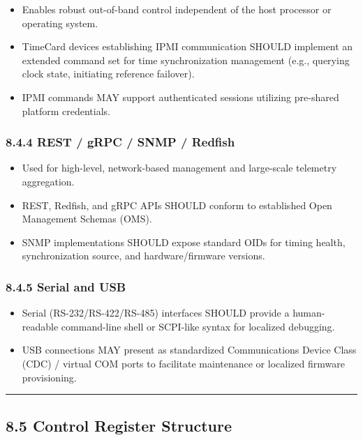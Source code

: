 \begin{itemize}
\tightlist
\item
  Enables robust out-of-band control independent of the host processor
  or operating system.
\item
  TimeCard devices establishing IPMI communication SHOULD implement an
  extended command set for time synchronization management (e.g.,
  querying clock state, initiating reference failover).
\item
  IPMI commands MAY support authenticated sessions utilizing pre-shared
  platform credentials.
\end{itemize}

\subsubsection{8.4.4 REST / gRPC / SNMP /
Redfish}\label{rest-grpc-snmp-redfish}

\begin{itemize}
\tightlist
\item
  Used for high-level, network-based management and large-scale
  telemetry aggregation.
\item
  REST, Redfish, and gRPC APIs SHOULD conform to established Open
  Management Schemas (OMS).
\item
  SNMP implementations SHOULD expose standard OIDs for timing health,
  synchronization source, and hardware/firmware versions.
\end{itemize}

\subsubsection{8.4.5 Serial and USB}\label{serial-and-usb}

\begin{itemize}
\tightlist
\item
  Serial (RS-232/RS-422/RS-485) interfaces SHOULD provide a
  human-readable command-line shell or SCPI-like syntax for localized
  debugging.
\item
  USB connections MAY present as standardized Communications Device
  Class (CDC) / virtual COM ports to facilitate maintenance or localized
  firmware provisioning.
\end{itemize}

\begin{center}\rule{0.5\linewidth}{0.5pt}\end{center}

\subsection{8.5 Control Register
Structure}\label{control-register-structure}

